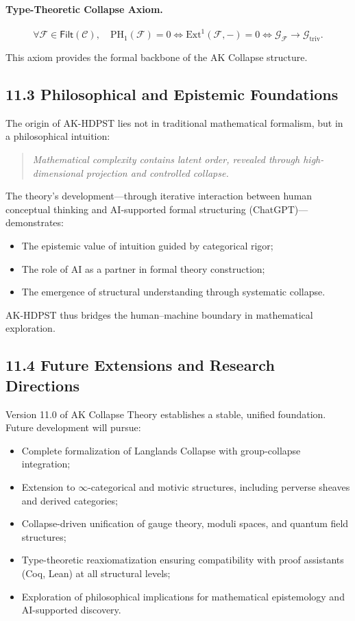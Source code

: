 \documentclass[11pt]{article}
\begin{document}
\paragraph{Type-Theoretic Collapse Axiom.}
\[
\forall \mathcal{F} \in \mathsf{Filt}(\mathcal{C}), \quad \mathrm{PH}_1(\mathcal{F}) = 0 \iff \mathrm{Ext}^1(\mathcal{F}, -) = 0 \iff \mathcal{G}_{\mathcal{F}} \longrightarrow \mathcal{G}_{\mathrm{triv}}.
\]

This axiom provides the formal backbone of the AK Collapse structure.

\subsection*{11.3 Philosophical and Epistemic Foundations}

The origin of AK-HDPST lies not in traditional mathematical formalism, but in a philosophical intuition:

\begin{quote}
\textit{Mathematical complexity contains latent order, revealed through high-dimensional projection and controlled collapse.}
\end{quote}

The theory's development—through iterative interaction between human conceptual thinking and AI-supported formal structuring (ChatGPT)—demonstrates:

\begin{itemize}
    \item The epistemic value of intuition guided by categorical rigor;
    \item The role of AI as a partner in formal theory construction;
    \item The emergence of structural understanding through systematic collapse.
\end{itemize}

AK-HDPST thus bridges the human–machine boundary in mathematical exploration.

\subsection*{11.4 Future Extensions and Research Directions}

Version 11.0 of AK Collapse Theory establishes a stable, unified foundation. Future development will pursue:

\begin{itemize}
    \item Complete formalization of Langlands Collapse with group-collapse integration;
    \item Extension to \(\infty\)-categorical and motivic structures, including perverse sheaves and derived categories;
    \item Collapse-driven unification of gauge theory, moduli spaces, and quantum field structures;
    \item Type-theoretic reaxiomatization ensuring compatibility with proof assistants (Coq, Lean) at all structural levels;
    \item Exploration of philosophical implications for mathematical epistemology and AI-supported discovery.
\end{itemize}
\end{document}
